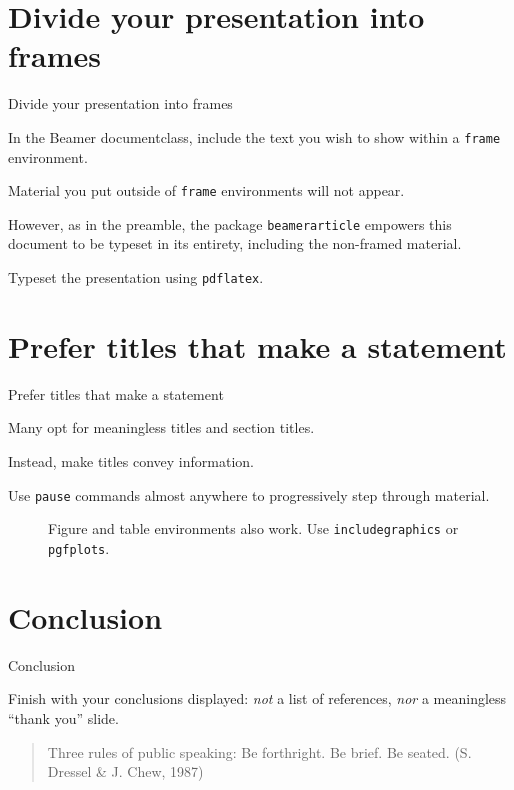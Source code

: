 \documentclass[aspectratio=169,ignorenonframetext,12pt]{beamer}
\begin{document}
\section{Divide your presentation into frames}
\begin{frame}{Divide your presentation into frames}

In the Beamer documentclass, include the text you wish to show within a \texttt{frame} environment.

Material you put outside of \texttt{frame} environments will not appear.

However, as in the preamble, the package \texttt{beamerarticle} empowers this document to be typeset in its entirety, including the non-framed material.

Typeset the presentation using \texttt{pdflatex}.
\end{frame}



\section{Prefer titles that make a statement}
\begin{frame}{Prefer titles that make a statement}

Many opt for meaningless titles and section titles.  

Instead, make titles convey information.

\pause

Use \texttt{pause} commands almost anywhere to progressively step through material.

\pause

\begin{figure}
\centering
\caption{Figure and table environments also work.
Use \texttt{includegraphics} or \texttt{pgfplots}.}
\end{figure}

\end{frame}




\section{Conclusion}
\begin{frame}{Conclusion}

Finish with your conclusions displayed: \emph{not} a list of references, \emph{nor} a meaningless ``thank you'' slide.

\vfill
\begin{quote}
	Three rules of public speaking: Be forthright.  Be brief.  Be
	seated. \hfill(S. Dressel \& J. Chew, 1987)
\end{quote}
\end{frame}
\end{document}
